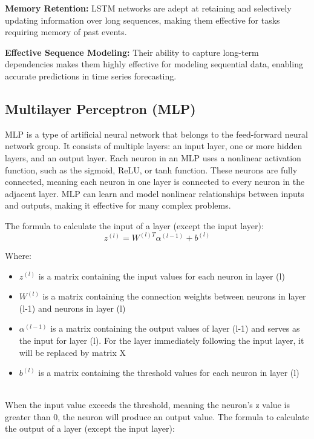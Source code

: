 \documentclass{ieeeojies}
\begin{document}
\textbf{Memory Retention:} LSTM networks are adept at retaining and selectively updating information over long sequences, making them effective for tasks requiring memory of past events.
  
\textbf{Effective Sequence Modeling:} Their ability to capture long-term dependencies makes them highly effective for modeling sequential data, enabling accurate predictions in time series forecasting.

\subsection{Multilayer Perceptron (MLP)}
MLP is a type of artificial neural network that belongs to the feed-forward neural network group. It consists of multiple layers: an input layer, one or more hidden layers, and an output layer. Each neuron in an MLP uses a nonlinear activation function, such as the sigmoid, ReLU, or tanh function. These neurons are fully connected, meaning each neuron in one layer is connected to every neuron in the adjacent layer. MLP can learn and model nonlinear relationships between inputs and outputs, making it effective for many complex problems.

The formula to calculate the input of a layer (except the input layer):\\

\[ z^{(l)} = W^{(l) T}\alpha^{(l-1)} + b^{(l)} \]

Where:\\
    \begin{itemize}
        \item $z^{(l)}$ is a matrix containing the input values for each neuron in layer (l)
        \item $W^{(l)}$ is a matrix containing the connection weights between neurons in layer (l-1) and neurons in layer (l)
        \item $\alpha^{(l-1)}$ is a matrix containing the output values of layer (l-1) and serves as the input for layer (l). For the layer immediately following the input layer, it will be replaced by matrix X
        \item $b^{(l)}$ is a matrix containing the threshold values for each neuron in layer (l)
    \end{itemize}\\
        
When the input value exceeds the threshold, meaning the neuron's z value is greater than 0, the neuron will produce an output value. The formula to calculate the output of a layer (except the input layer):\\
\end{document}
